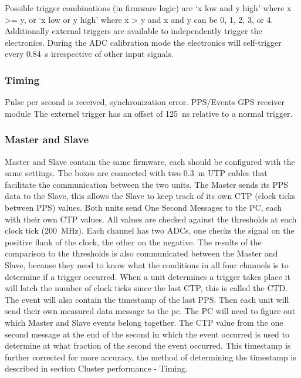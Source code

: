 Possible trigger combinations (in firmware logic) are `x low and y high' where x >= y, or `x low or y high' where  x > y and x and y can be 0, 1, 2, 3, or 4. Additionally external triggers are available to independently trigger the electronics. During the ADC calibration mode the electronics will self-trigger every \SI{.84}{\second} irrespective of other input signals.


\subsubsection{Timing}

Pulse per second is received, synchronization error.
PPS/Events
GPS receiver module \cite{trimble}
The externel trigger has an offset of \SI{125}{\ns} relative to a normal trigger.


\subsubsection{Master and Slave}
\label{sub:masterslave}

Master and Slave contain the same firmware, each should be configured with the same settings. The boxes are connected with two \SI{0.3}{\meter} UTP cables that facilitate the communication between the two units. The Master sends its PPS data to the Slave, this allows the Slave to keep track of its own CTP (clock ticks between PPS) values. Both units send One Second Messages to the PC, each with their own CTP values. All \adc values are checked against the thresholds at each clock tick (\SI{200}{\mega\hertz}). Each channel has two ADCs, one checks the signal on the positive flank of the clock, the other on the negative. The results of the comparison to the thresholds is also communicated between the Master and Slave, because they need to know what the conditions in all four channels is to determine if a trigger occurred. When a unit determines a trigger takes place it will latch the number of clock ticks since the last CTP, this is called the CTD. The event will also contain the timestamp of the last PPS. Then each unit will send their own measured data message to the pc. The PC will need to figure out which Master and Slave events belong together. The CTP value from the one second message at the end of the second in which the event occurred is used to determine at what fraction of the second the event occurred. This timestamp is further corrected for more accuracy, the method of determining the \gps timestamp is described in section Cluster performance - Timing.


